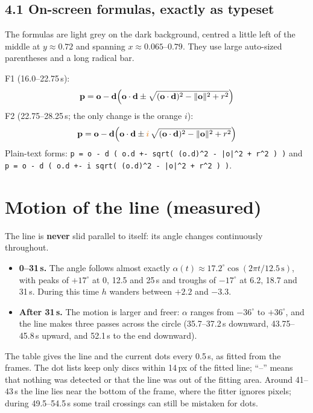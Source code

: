 \documentclass[10pt,a4paper]{article}
\begin{document}
\subsection*{4.1 On-screen formulas, exactly as typeset}
The formulas are light grey on the dark background, centred a little left of the middle at $y\approx0.72$ and spanning $x\approx0.065$--$0.79$. They use large auto-sized parentheses and a long radical bar.

F1 (16.0--22.75\,s):
\[\mathbf{p}=\mathbf{o}-\mathbf{d}\Bigl(\mathbf{o}\cdot\mathbf{d}\pm\sqrt{(\mathbf{o}\cdot\mathbf{d})^2-\lVert\mathbf{o}\rVert^2+r^2}\Bigr)\]
F2 (22.75--28.25\,s; the only change is the orange $i$):
\[\mathbf{p}=\mathbf{o}-\mathbf{d}\Bigl(\mathbf{o}\cdot\mathbf{d}\pm\textcolor{orange!90!black}{i}\,\sqrt{(\mathbf{o}\cdot\mathbf{d})^2-\lVert\mathbf{o}\rVert^2+r^2}\Bigr)\]
Plain-text forms: \texttt{p = o - d ( o.d +- sqrt( (o.d)\^{}2 - |o|\^{}2 + r\^{}2 ) )} and \texttt{p = o - d ( o.d +- i sqrt( (o.d)\^{}2 - |o|\^{}2 + r\^{}2 ) )}.

\section{Motion of the line (measured)}
The line is \textbf{never} slid parallel to itself: its angle changes continuously throughout.
\begin{itemize}
\item \textbf{0--31\,s.} The angle follows almost exactly $\alpha(t)\approx17.2^\circ\cos(2\pi t/12.5\,\mathrm{s})$, with peaks of $+17^\circ$ at 0, 12.5 and 25\,s and troughs of $-17^\circ$ at 6.2, 18.7 and 31\,s. During this time $h$ wanders between $+2.2$ and $-3.3$.
\item \textbf{After 31\,s.} The motion is larger and freer: $\alpha$ ranges from $-36^\circ$ to $+36^\circ$, and the line makes three passes across the circle (35.7--37.2\,s downward, 43.75--45.8\,s upward, and 52.1\,s to the end downward).
\end{itemize}
The table gives the line and the current dots every 0.5\,s, as fitted from the frames. The dot lists keep only discs within 14\,px of the fitted line; ``--'' means that nothing was detected or that the line was out of the fitting area. Around 41--43\,s the line lies near the bottom of the frame, where the fitter ignores pixels; during 49.5--54.5\,s some trail crossings can still be mistaken for dots.
\end{document}
